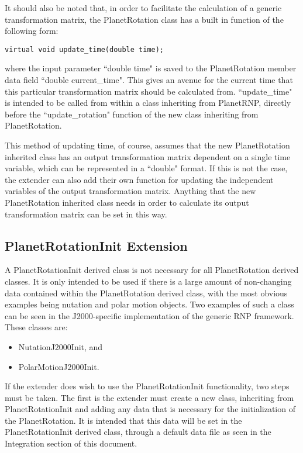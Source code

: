 It should also be noted that, in order to facilitate the
calculation of a generic transformation matrix,
the PlanetRotation class has a built in function of the following form:

\begin{verbatim}
virtual void update_time(double time);
\end{verbatim}

where the input parameter ``double time" is saved to the
PlanetRotation member data field
``double current\_time". This gives an avenue
for the current time that this particular transformation matrix should be
calculated from. ``update\_time" is intended to be called from within a class
inheriting from PlanetRNP, directly before the ``update\_rotation" function
of the new class inheriting from PlanetRotation.

This method of updating time, of course, assumes that the new
PlanetRotation inherited class has an output transformation matrix dependent
on a single time variable, which can be represented in a ``double" format.
If this is not the case, the extender can also add their own function for
updating the independent variables of the output transformation matrix.
Anything that the new PlanetRotation inherited class needs in order to
calculate its output transformation matrix can be set in this way.

\subsection{PlanetRotationInit Extension}

A PlanetRotationInit derived class is not necessary for all PlanetRotation
derived classes. It is only intended to be used if there is a large amount of
non-changing data contained within the PlanetRotation derived class, with
the most obvious examples being nutation and polar motion objects. Two
examples of such a class can be seen in the J2000-specific implementation
of the generic RNP framework. These classes are:

\begin{itemize}
\item{NutationJ2000Init}, and
\item{PolarMotionJ2000Init}.
\end{itemize}

If the extender does wish to use the PlanetRotationInit functionality, two
steps must be taken. The first is the extender must create a new class,
inheriting from PlanetRotationInit and adding any data that is necessary
for the initialization of the PlanetRotation. It is intended that this data
will be set in the PlanetRotationInit derived class, through a default data
file as seen in the Integration section of this document.

